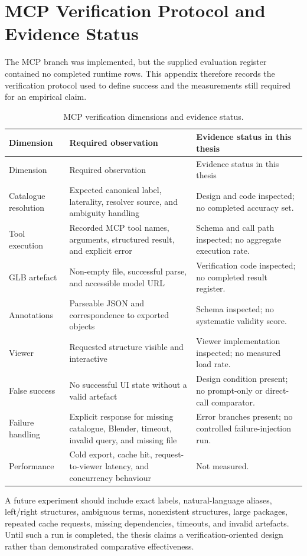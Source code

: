 \chapter{MCP Verification Protocol and Evidence Status}
\label{app:mcp-templates}

The MCP branch was implemented, but the supplied evaluation register contained no completed runtime rows. This appendix therefore records the verification protocol used to define success and the measurements still required for an empirical claim.

\begin{longtable}{L{0.23\textwidth}L{0.34\textwidth}L{0.31\textwidth}}
\caption{MCP verification dimensions and evidence status.}\label{tab:mcp-verification-status}\\
\toprule
Dimension & Required observation & Evidence status in this thesis \\
\midrule
\endfirsthead
\toprule
Dimension & Required observation & Evidence status in this thesis \\
\midrule
\endhead
Catalogue resolution & Expected canonical label, laterality, resolver source, and ambiguity handling & Design and code inspected; no completed accuracy set. \\
Tool execution & Recorded MCP tool names, arguments, structured result, and explicit error & Schema and call path inspected; no aggregate execution rate. \\
GLB artefact & Non-empty file, successful parse, and accessible model URL & Verification code inspected; no completed result register. \\
Annotations & Parseable JSON and correspondence to exported objects & Schema inspected; no systematic validity score. \\
Viewer & Requested structure visible and interactive & Viewer implementation inspected; no measured load rate. \\
False success & No successful UI state without a valid artefact & Design condition present; no prompt-only or direct-call comparator. \\
Failure handling & Explicit response for missing catalogue, Blender, timeout, invalid query, and missing file & Error branches present; no controlled failure-injection run. \\
Performance & Cold export, cache hit, request-to-viewer latency, and concurrency behaviour & Not measured. \\
\bottomrule
\end{longtable}

A future experiment should include exact labels, natural-language aliases, left/right structures, ambiguous terms, nonexistent structures, large packages, repeated cache requests, missing dependencies, timeouts, and invalid artefacts. Until such a run is completed, the thesis claims a verification-oriented design rather than demonstrated comparative effectiveness.
